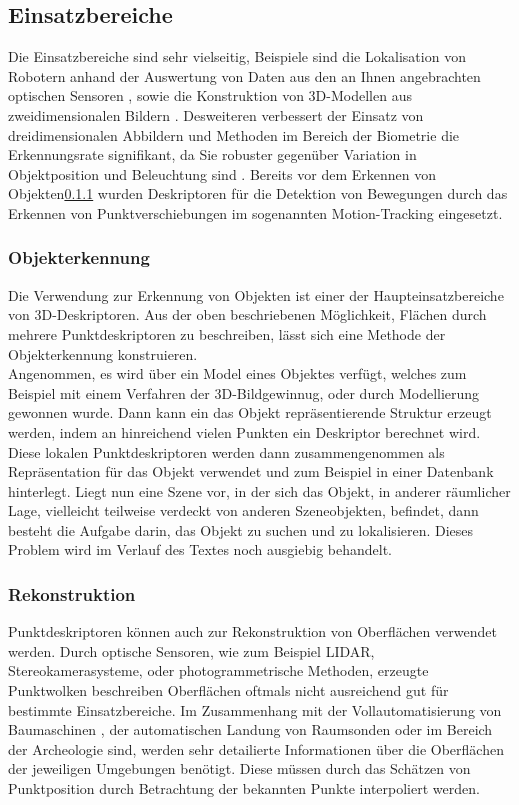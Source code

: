 \documentclass[12pt]{article}
\begin{document}
 

\subsection{Einsatzbereiche} Die Einsatzbereiche sind sehr vielseitig, Beispiele sind die Lokalisation von Robotern anhand der Auswertung von Daten aus den an Ihnen angebrachten optischen Sensoren \cite{robot} , sowie die Konstruktion von 3D-Modellen aus zweidimensionalen Bildern \cite{SpinImage}. Desweiteren verbessert der Einsatz von dreidimensionalen Abbildern und Methoden im Bereich der Biometrie die Erkennungsrate signifikant, da Sie robuster gegenüber Variation in Objektposition und Beleuchtung sind \cite{biometrics}.
Bereits vor dem Erkennen von Objekten\ref{obj} wurden Deskriptoren für die Detektion von Bewegungen durch das Erkennen von Punktverschiebungen im sogenannten Motion-Tracking eingesetzt.

\subsubsection{Objekterkennung}\label{obj}
Die Verwendung zur Erkennung von Objekten ist einer der Haupteinsatzbereiche von 3D-Deskriptoren. Aus der oben beschriebenen Möglichkeit, Flächen durch mehrere Punktdeskriptoren zu beschreiben, lässt sich eine Methode der Objekterkennung konstruieren.\\
Angenommen, es wird über ein Model eines Objektes verfügt, welches zum Beispiel mit einem Verfahren der 3D-Bildgewinnug, oder durch Modellierung gewonnen wurde. Dann kann ein das Objekt repräsentierende Struktur erzeugt werden, indem an hinreichend vielen Punkten ein Deskriptor berechnet wird. Diese lokalen Punktdeskriptoren werden dann zusammengenommen als Repräsentation für das Objekt verwendet und zum Beispiel in einer Datenbank hinterlegt. Liegt nun eine Szene vor, in der sich das Objekt, in anderer räumlicher Lage, vielleicht teilweise verdeckt von anderen Szeneobjekten, befindet, dann besteht die Aufgabe darin, das Objekt zu suchen und zu lokalisieren. Dieses Problem wird im Verlauf des Textes noch ausgiebig behandelt. 

\subsubsection{Rekonstruktion}\label{rec}
Punktdeskriptoren können auch zur Rekonstruktion von Oberflächen verwendet werden. Durch optische Sensoren, wie zum Beispiel LIDAR, Stereokamerasysteme, oder photogrammetrische Methoden, erzeugte Punktwolken beschreiben Oberflächen oftmals nicht ausreichend gut für bestimmte Einsatzbereiche. Im Zusammenhang mit der Vollautomatisierung von Baumaschinen \cite{constr}, der automatischen Landung von Raumsonden oder im Bereich der Archeologie \cite{cavity} sind, werden sehr detailierte Informationen über die Oberflächen der jeweiligen Umgebungen benötigt. Diese müssen durch das Schätzen von Punktposition durch Betrachtung der bekannten Punkte interpoliert werden.
\end{document}
